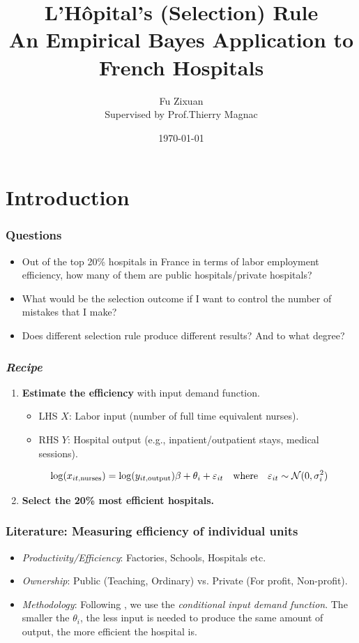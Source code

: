 \documentclass[10pt,mathserif,aspectratio=169]{beamer}
\title{\large \bfseries L'Hôpital's (Selection) Rule\\
  An Empirical Bayes Application to French Hospitals}
\author{Fu Zixuan\\[3ex]
  Supervised by Prof.Thierry Magnac}
\date{\today}
\begin{document}
\frame{
  \thispagestyle{empty}
  \titlepage
}

\section{Introduction}

\begin{frame}
  \frametitle{Questions}
  \begin{itemize}\itemsep=12pt
    \item Out of the top 20\% hospitals in France in terms of labor employment
          efficiency, how many of them are public hospitals/private hospitals?
    \item What would be the selection outcome if I want to control the number of mistakes
          that I make?
    \item Does different selection rule produce different results? And to what degree?
  \end{itemize}
\end{frame}

\begin{frame}
  \frametitle{\textit{Recipe}}
  \begin{enumerate}\itemsep=12pt
    \item \textbf{Estimate the efficiency} with input demand function.
          \begin{itemize} \itemsep=8pt
            \item LHS $X$: Labor input (number of full time equivalent nurses).
            \item RHS $Y$: Hospital output (e.g., inpatient/outpatient stays, medical sessions).
          \end{itemize}
          \begin{equation*}
            \log(x_{it,\text{nurses}}) = \log(y_{it,\text{output}})\beta +\theta_i +\varepsilon_{it} \quad \text{where}\quad \varepsilon_{it} \sim \mathcal{N}(0,\sigma_i^2)
          \end{equation*}
    \item \textbf{Select the 20\% most efficient hospitals.}

  \end{enumerate}
\end{frame}

\begin{frame}[label=literature]
  \frametitle{Literature: Measuring efficiency of individual units}
  \begin{itemize}\itemsep=12pt

    \item \textit{Productivity/Efficiency}: Factories, Schools, Hospitals etc.
    \item \textit{Ownership}: Public (Teaching, Ordinary) vs. Private (For profit, Non-profit).
    \item \textit{Methodology}: Following \citet{croiset2024hospitals}, we use the \textit{conditional input demand function}.
          The smaller the $\theta_i$, the less input is needed to produce the same amount
          of output, the more efficient the hospital is.\hyperlink{inputdemand}{}
  \end{itemize}
\end{frame}
\end{document}
